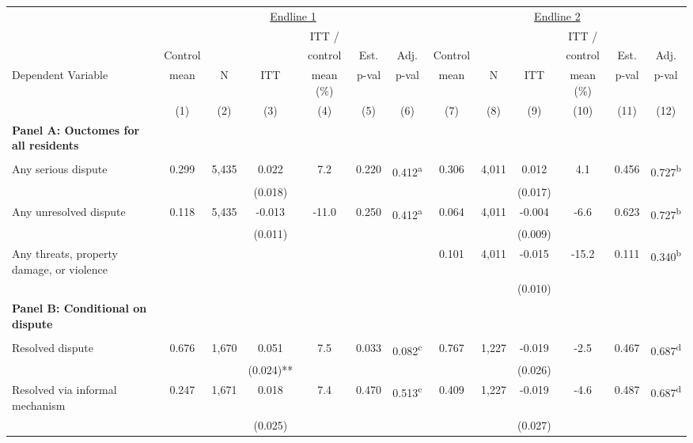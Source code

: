 \begin{tabular}{lcccccccccccc}
\hline \noalign{\smallskip} & \multicolumn{6}{c}{\uline{\hfill Endline 1 \hfill}} & \multicolumn{6}{c}{\uline{\hfill Endline 2 \hfill}}\\
 &  &  &  & ITT / &  &  &  &  &  & ITT / &  & \\
 & Control &  &  & control & Est. & Adj. & Control &  &  & control & Est. & Adj.\\
Dependent Variable & mean & N & ITT & mean (\%) & p-val & p-val & mean & N & ITT & mean (\%) & p-val & p-val\\
 & (1) & (2) & (3) & (4) & (5) & (6) & (7) & (8) & (9) & (10) & (11) & (12)\\
\noalign{\smallskip}\hline \noalign{\smallskip}\textbf{Panel A: Ouctomes for all residents} &  &  &  &  &  &  &  &  &  &  &  & \\
 &  &  &  &  &  &  &  &  &  &  &  & \\
Any serious dispute & 0.299 & 5,435 & 0.022 & 7.2 & 0.220 & 0.412\textsuperscript{a} & 0.306 & 4,011 & 0.012 & 4.1 & 0.456 & 0.727\textsuperscript{b}\\
 &  &  & (0.018) &  &  &  &  &  & (0.017) &  &  & \\
Any unresolved dispute & 0.118 & 5,435 & -0.013 & -11.0 & 0.250 & 0.412\textsuperscript{a} & 0.064 & 4,011 & -0.004 & -6.6 & 0.623 & 0.727\textsuperscript{b}\\
 &  &  & (0.011) &  &  &  &  &  & (0.009) &  &  & \\
\phantom{} Any threats, property damage, or violence &  &  &  &  &  &  & 0.101 & 4,011 & -0.015 & -15.2 & 0.111 & 0.340\textsuperscript{b}\\
 &  &  &  &  &  &  &  &  & (0.010) &  &  & \\
\textbf{Panel B: Conditional on dispute} &  &  &  &  &  &  &  &  &  &  &  & \\
 &  &  &  &  &  &  &  &  &  &  &  & \\
Resolved dispute & 0.676 & 1,670 & 0.051 & 7.5 & 0.033 & 0.082\textsuperscript{c} & 0.767 & 1,227 & -0.019 & -2.5 & 0.467 & 0.687\textsuperscript{d}\\
 &  &  & (0.024)** &  &  &  &  &  & (0.026) &  &  & \\
\quad Resolved via informal mechanism & 0.247 & 1,671 & 0.018 & 7.4 & 0.470 & 0.513\textsuperscript{c} & 0.409 & 1,227 & -0.019 & -4.6 & 0.487 & 0.687\textsuperscript{d}\\
 &  &  & (0.025) &  &  &  &  &  & (0.027) &  &  & \\

\end{tabular}
